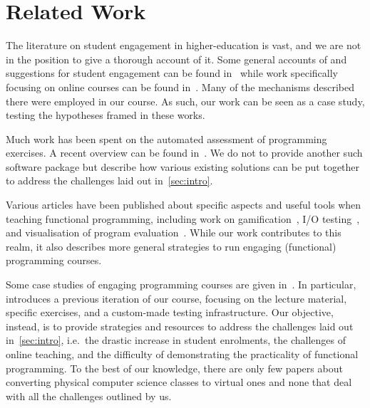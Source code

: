 \section{Related Work}\label{sec:related_work}

The literature on student engagement in higher-education is vast,
and we are not in the position to give a thorough account of it.
Some general accounts of and suggestions for
student engagement can be found in~\cite{student_engagement,engagementproposals}
while work specifically focusing on online courses can be found in~\cite{onlineengagement3,onlineengagement2,onlineengagement4,onlineengagement5,onlineengagement1}.
Many of the mechanisms described there were employed in our course.
As such, our work can be seen as a case study, testing the hypotheses framed in these works.

Much work has been spent on the
automated assessment of programming exercises.
A recent overview can be found in~\cite{automatedassessment}.
We do not to provide another such software package but
describe how various existing solutions
can be put together to
address the challenges laid out in~\cref{sec:intro}.

Various articles have been published about
specific aspects and useful tools when teaching functional programming,
including work on gamification~\cite{soccerfun},
I/O testing~\cite{iotest2}, and
visualisation of program evaluation~\cite{steppingocaml}.
While our work contributes to this realm,
it also describes more general strategies
to run engaging (functional) programming courses.

Some case studies of engaging programming courses are given in~\cite{next_1100,engagingprogramming,largeprogrammingclass}.
In particular,~\cite{next_1100}
introduces a previous iteration of our course,
focusing on the lecture material,
specific exercises, and a custom-made testing infrastructure.
Our objective, instead, is to provide strategies and resources to address
the challenges laid out in~\cref{sec:intro},
i.e.\ the drastic increase in student enrolments,
the challenges of online teaching,
and the difficulty of demonstrating the practicality of functional programming.
To the best of our knowledge,
there are only few papers about converting physical computer science classes to virtual ones
and none that deal with all the challenges outlined by us.

